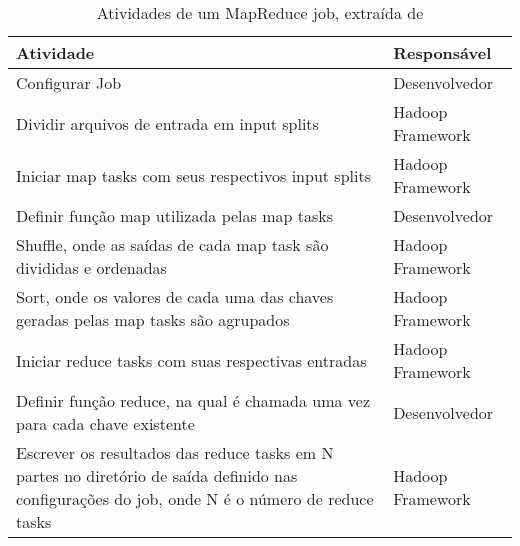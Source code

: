 \begin{table}[!ht]
\begin{center}
  \begin{tabular}{|p{5cm}|p{5cm}|}
	\hline
	Atividade & Responsável	
	\\ \hline
	Configurar Job & Desenvolvedor
	\\ \hline
	Dividir arquivos de entrada em input splits & Hadoop Framework
	\\ \hline
	Iniciar map tasks com seus respectivos input splits & Hadoop Framework
	\\ \hline
	Definir função map utilizada pelas map tasks & Desenvolvedor
	\\ \hline
	Shuffle, onde as saídas de cada map task são divididas e ordenadas & Hadoop Framework
	\\ \hline
	Sort, onde os valores de cada uma das chaves geradas pelas map tasks são agrupados & Hadoop Framework
	\\ \hline
	Iniciar reduce tasks com suas respectivas entradas & Hadoop Framework
	\\ \hline
	Definir função reduce, na qual é chamada uma vez para cada chave existente & Desenvolvedor
	\\ \hline
	Escrever os resultados das reduce tasks em N partes no diretório de saída definido nas configurações do job, onde N é o número de reduce tasks & Hadoop Framework
	\\ \hline
  \end{tabular}
  \caption{Atividades de um MapReduce job, extraída de 
  }
\label{tab-mapreduce-job}
\end{center}
\end{table}













